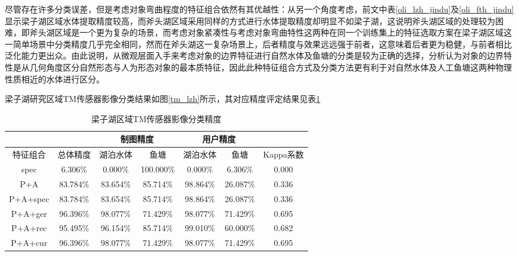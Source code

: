 \documentclass[supercite]{upcthesis}
\begin{document}
\begin{itemize}
尽管存在许多分类误差，但是考虑对象弯曲程度的特征组合依然有其优越性：从另一个角度考虑，前文中表\ref{oli_lzh_jindu}及\ref{oli_fth_jindu}显示梁子湖区域水体提取精度较高，而斧头湖区域采用同样的方式进行水体提取精度却明显不如梁子湖，这说明斧头湖区域的处理较为困难，即斧头湖区域是一个更为复杂的场景，而考虑对象紧凑性与考虑对象弯曲特性这两种在同一个训练集上的特征选取方案在梁子湖区域这一简单场景中分类精度几乎完全相同，然而在斧头湖这一复杂场景上，后者精度与效果远远强于前者，这意味着后者更为稳健，与前者相比泛化能力更出众。由此说明，从微观层面入手来考虑对象的边界特征进行自然水体及鱼塘的分类是较为正确的选择，分析认为对象的边界特性是从几何角度区分自然形态与人为形态对象的最本质特征，因此此种特征组合方式及分类方法更有利于对自然水体及人工鱼塘这两种物理性质相近的水体进行区分。
\end{itemize}
梁子湖研究区域TM传感器影像分类结果如图\ref{tm_lzh}所示，其对应精度评定结果见表\ref{tm_lzh_jindu}
\begin{figure*}[p]
	\centering
	\caption{梁子湖区域TM影像水体分类结果}
	\label{tm_lzh}
\end{figure*}

\begin{table}[p]
	\small
	\newcommand{\tabincell}[2]{\begin{tabular}{@{}#1@{}}#2\end{tabular}}  
	\centering
	\caption{梁子湖区域TM传感器影像分类精度}
	\begin{tabular}{ccccccc}
		\toprule
		&  &\multicolumn{2}{c}{制图精度}&\multicolumn{2}{c}{用户精度} &\\ \midrule 
		特征组合&总体精度  &湖泊水体    & 鱼塘  &湖泊水体&鱼塘&Kappa系数\\
		spec&	6.306\%&	0.000\%&	100.000\%&	0.000\%&	6.306\%&	0.000\\
		P+A&	83.784\%&	83.654\%&	85.714\%&	98.864\%&	26.087\%&	0.336\\
		P+A+spec&	83.784\%&	83.654\%&	85.714\%&	98.864\%&	26.087\%&	0.336\\
		P+A+ger&	96.396\%&	98.077\%&	71.429\%&	98.077\%&	71.429\%&	0.695\\
		P+A+rec&	95.495\%&	96.154\%&	85.714\%&	99.010\%&	60.000\%&	0.682\\
		P+A+cur&	96.396\%&	98.077\%&	71.429\%&	98.077\%&	71.429\%&	0.695\\
		\bottomrule
	\end{tabular}
	\label{tm_lzh_jindu}
\end{table}
\end{document}
